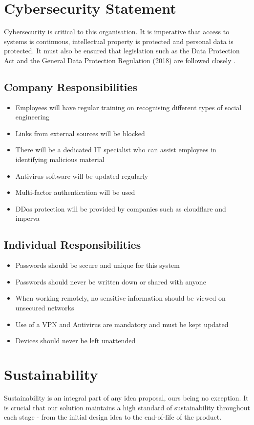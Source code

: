 \documentclass{article}
\begin{document}
\section{Cybersecurity Statement}
Cybersecurity is critical to this organisation. It is imperative that access to systems is continuous, intellectual property is protected and personal data is protected. It must also be ensured that legislation such as the Data Protection Act and the General Data Protection Regulation (2018) are followed closely \cite{GOV}.

\subsection{Company Responsibilities}
\begin{itemize}
    \item Employees will have regular training on recognising different types of social engineering
    \item Links from external sources will be blocked
    \item There will be a dedicated IT specialist who can assist employees in identifying malicious material
    \item Antivirus software will be updated regularly
    \item Multi-factor authentication will be used
    \item DDos protection will be provided by companies such as cloudflare and imperva 
\end{itemize}

\subsection{Individual Responsibilities}
\begin{itemize}
    \item Passwords should be secure and unique for this system
    \item Passwords should never be written down or shared with anyone
    \item When working remotely, no sensitive information should be viewed on unsecured networks
    \item Use of a VPN and Antivirus are mandatory and must be kept updated
    \item Devices should never be left unattended
\end{itemize}

\section{Sustainability}
Sustainability is an integral part of any idea proposal, ours being no exception. It is crucial that our solution maintains a high standard of sustainability throughout each stage - from the initial design idea to the end-of-life of the product.
\end{document}
